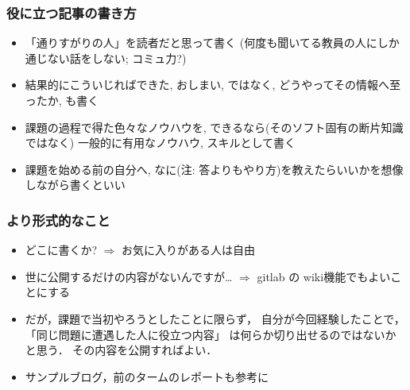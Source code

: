 \documentclass[12pt,dvipdfmx]{beamer}
\newcommand{\ao}[1]{{\color{blue}#1}}
\begin{document}
\begin{frame}
\frametitle{役に立つ記事の書き方}
\begin{itemize}
\item 「通りすがりの人」を読者だと思って書く
  (何度も聞いてる教員の人にしか通じない話をしない; 
  コミュ力?)

\item 結果的にこういじればできた, おしまい, 
ではなく, \ao{どうやってその情報へ至ったか}, も書く

\item 課題の過程で得た色々なノウハウを, 
できるなら(そのソフト固有の断片知識ではなく)
一般的に有用なノウハウ, スキルとして書く

\item 課題を始める前の自分へ, なに(注: 答よりもやり方)を教えたらいいかを想像しながら書くといい
\end{itemize}
\end{frame}

\begin{frame}
\frametitle{より形式的なこと}
\begin{itemize}
\item<1-> どこに書くか? $\Rightarrow$ お気に入りがある人は自由
\item<2-> 世に公開するだけの内容がないんですが\ldots 
$\Rightarrow$ gitlab の wiki機能でもよいことにする
\item<3-> だが，課題で当初やろうとしたことに限らず，
  自分が今回経験したことで，
  「同じ問題に遭遇した人に役立つ内容」
  は何らか切り出せるのではないかと思う．
  その内容を公開すればよい．

\item<4-> サンプルブログ，前のタームのレポートも参考に
\end{itemize}
\end{frame}
\end{document}

